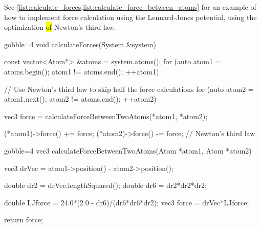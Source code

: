See \cref{list:calculate_forces,list:calculate_force_between_atoms} for an example of how to implement force calculation using the Lennard-Jones potential, using the optimization \hl{of} Newton's third law.
%
\begin{listing}[!htb]%
%                 
\begin{cppcode*}{gobble=4}
    void calculateForces(System &system)
    {
        const vector<Atom*> &atoms = system.atoms();
        for (auto atom1 = atoms.begin(); atom1 != atoms.end(); ++atom1)
        {
            // Use Newton's third law to skip half the force calculations
            for (auto atom2 = atom1.next(); atom2 != atoms.end(); ++atom2)
            {
                vec3 force = calculateForceBetweenTwoAtoms(*atom1, *atom2);
                
                (*atom1)->force() += force;
                (*atom2)->force() -= force; // Newton's third law
            }
        }
    }
\end{cppcode*}
\caption{%
    Implementation of \texttt{calculateForces} from \cref{list:simple_md_program}.%
    \label{list:calculate_forces}%
}%
\end{listing}%
%
\begin{listing}[!htb]%
\begin{cppcode*}{gobble=4}
    vec3 calculateForceBetweenTwoAtoms(Atom *atom1, Atom *atom2)
    {
        vec3 drVec = atom1->position() - atom2->position();
        
        double dr2 = drVec.lengthSquared();
        double dr6 = dr2*dr2*dr2;

        double LJforce = 24.0*(2.0 - dr6)/(dr6*dr6*dr2);
        vec3 force = drVec*LJforce;
        
        return force;
    }
\end{cppcode*}
\caption{%
    Implementation of \texttt{calculateForceBetweenTwoAtoms} from \cref{list:calculate_forces}.%
    \label{list:calculate_force_between_atoms}%
}%
\end{listing}%

